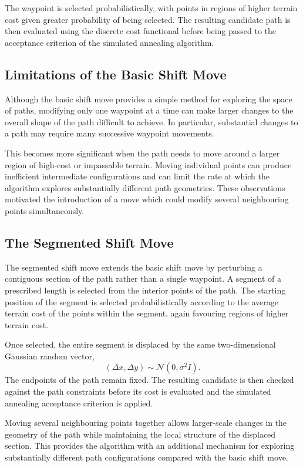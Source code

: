 The waypoint is selected probabilistically, with points in regions of
higher terrain cost given greater probability of being selected. The
resulting candidate path is then evaluated using the discrete cost
functional before being passed to the acceptance criterion of the
simulated annealing algorithm.

\subsection{Limitations of the Basic Shift Move}
\label{subsec:shift_move_limitations}

Although the basic shift move provides a simple method for exploring
the space of paths, modifying only one waypoint at a time can make
larger changes to the overall shape of the path difficult to achieve.
In particular, substantial changes to a path may require many
successive waypoint movements.

This becomes more significant when the path needs to move around a
larger region of high-cost or impassable terrain. Moving individual
points can produce inefficient intermediate configurations and can
limit the rate at which the algorithm explores substantially different
path geometries. These observations motivated the introduction of a
move which could modify several neighbouring points simultaneously.

\subsection{The Segmented Shift Move}
\label{subsec:segmented_shift}

The segmented shift move extends the basic shift move by perturbing a
contiguous section of the path rather than a single waypoint. A segment
of a prescribed length is selected from the interior points of the
path. The starting position of the segment is selected probabilistically
according to the average terrain cost of the points within the
segment, again favouring regions of higher terrain cost.

Once selected, the entire segment is displaced by the same
two-dimensional Gaussian random vector,
\[
(\Delta x,\Delta y)\sim\mathcal{N}(0,\sigma^2 I).
\]
The endpoints of the path remain fixed. The resulting candidate is
then checked against the path constraints before its cost is evaluated
and the simulated annealing acceptance criterion is applied.

Moving several neighbouring points together allows larger-scale
changes in the geometry of the path while maintaining the local
structure of the displaced section. This provides the algorithm with
an additional mechanism for exploring substantially different path
configurations compared with the basic shift move.



